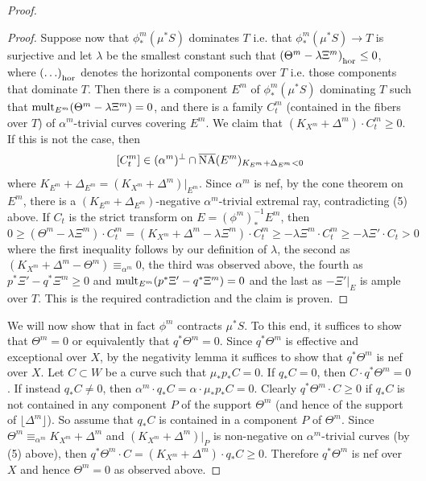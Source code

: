 \documentclass[12pt]{amsart}
\theoremstyle{plain}
\theoremstyle{remark}
\theoremstyle{definition}
\newcommand{\<}{\leq}
\theoremstyle{definition}
\theoremstyle{definition}
\numberwithin{equation}{section}
\theoremstyle{remark}
\begin{document}
\begin{proof}
\begin{proof}
    Suppose now that $\phi^m _*(\mu ^{*}S)$ dominates $T$ i.e. that $\phi^m _*(\mu ^{*}S)\to T$ is surjective and let $\lambda$ be the smallest constant such that $(\Theta^m-\lambda \Xi^m)_\textsubscript{hor}\leq 0$,  where $(\ldots )_\textsubscript{hor}$ denotes the horizontal components over $T$ i.e. those components that dominate $T$. Then there is a component $E^m$ of $\phi^m _*(\mu ^{*}S)$ dominating $T$  such that ${\rm mult }_{E^m}(\Theta^m-\lambda \Xi^m)=0$, and  there is a family  $C^m_t$ (contained in the fibers over $T$) of $\alpha ^m$-trivial curves covering $E^m$. We claim that $(K_{X^m}+\Delta ^m)\cdot C^m_t\geq 0$.  
    If this is not the case, then \[ [C^m_t]\in (\alpha ^m) ^\perp\cap \overline{\rm NA}(E^m)_{K_{E^m}+\Delta _{E^m}<0 }\] where $K_{E^m}+\Delta _{E^m}=(K_{X^m}+\Delta ^m)|_{E^m}$. Since $\alpha^m$ is nef, by the cone theorem on $E^m$, there is a $(K_{E^m}+\Delta _{E^m})$-negative $\alpha^m$-trivial extremal ray, contradicting (5) above.
    If $C_t$ is the strict transform on $E=(\phi^m) ^{-1}_*E^m$, then 
    \[0\geq (\Theta^m-\lambda \Xi^m)\cdot C^m_t= (K_{X^m}+\Delta ^m-\lambda \Xi^m) \cdot C^m_t\geq -\lambda \Xi^m \cdot C^m_t\geq -\lambda \Xi'\cdot C_t>0\]
    where the first inequality follows by our definition of $\lambda$, the second as $(K_{X^m}+\Delta ^m-\Theta ^m)\equiv _{\alpha ^m}0$, the third was observed above, the fourth as $p^*\Xi'- q^*\Xi^m\geq 0$ and ${\rm mult}_{E^m}(p^*\Xi'- q^*\Xi^m)=0$ and the last as $-\Xi'|_E$ is ample over $T$. This is the required contradiction and the claim is proven.
\end{proof}
We will now show that in fact $\phi ^m$ contracts $\mu ^*S$. To this end, it suffices to show that $\Theta^m=0$ or equivalently that $q^*\Theta^m=0$.
Since $q^*\Theta^m$ is effective and exceptional over $X$, by the negativity lemma it suffices to show that $q^*\Theta^m$ is nef over $X$. Let $C\subset W$ be a curve such that $\mu _*p_*C=0$. If $q_*C=0$, then $C\cdot q^*\Theta^m=0$. If instead $q_*C\ne 0$, then
       $\alpha ^m\cdot q_*C=\alpha \cdot \mu _* p_*C=0$. Clearly $q^*\Theta^m\cdot C\geq 0$ if $q_*C$ is not contained in any component $P$ of the support $\Theta^m$ (and hence of the support of $\lfloor \Delta ^m\rfloor$). So assume that $q_*C$ is contained in a component $P$ of $\Theta^m$. 
       Since $\Theta^m\equiv _{\alpha ^m}K_{X^m}+\Delta ^m$ and $(K_{X^m}+\Delta ^m)|_P$ is non-negative on $\alpha ^m$-trivial curves (by (5) above), then $q^*\Theta^m\cdot C=(K_{X^m}+\Delta ^m)\cdot q_*C \geq 0$. Therefore $q^*\Theta^m$ is nef over $X$ and hence $\Theta^m=0$ as observed above.


\end{proof}
\end{document}
